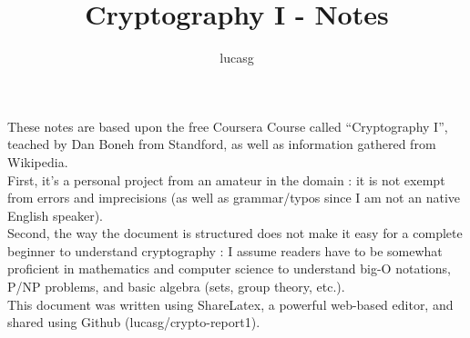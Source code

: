 \documentclass[fleqn,a4paper,12pt]{book}
\title{Cryptography I - Notes \vfill}
\author{lucasg}
\theoremstyle{break}
\begin{document}
\maketitle

\vspace*{6cm}
\hfill
\begin{minipage}[c]{0.8\linewidth}
\begin{Large}

These notes are based upon the free Coursera Course called ``Cryptography I'', teached by Dan Boneh from Standford, as well as information gathered from Wikipedia.\\
First, it's  a personal project from an amateur in the domain : it is not exempt from errors and imprecisions (as well as grammar/typos since I am not an native English speaker).\\
Second, the way the document is structured does not make it easy for a complete beginner to understand cryptography : I assume readers have to be somewhat proficient in mathematics and computer science to understand big-O notations, P/NP problems, and basic algebra (sets, group theory, etc.). \\

This document was written using ShareLatex, a powerful web-based editor, and shared using Github (lucasg/crypto-report1).

\end{Large}
\end{minipage}


\tableofcontents











\end{document}
